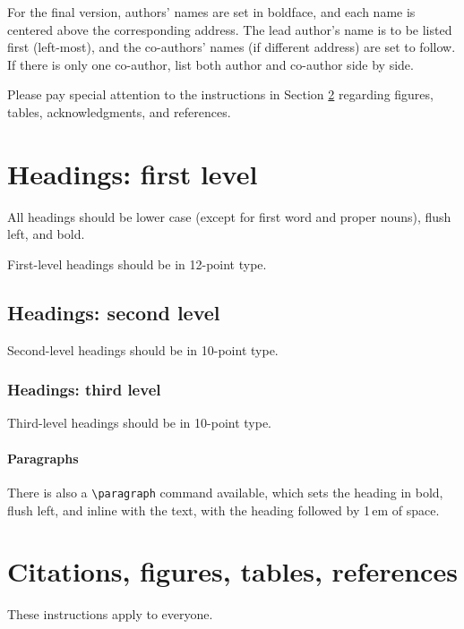 \documentclass{article}
\begin{document}
\begin{CJK}{UTF8}{gbsn}
For the final version, authors' names are set in boldface, and each name is
centered above the corresponding address. The lead author's name is to be listed
first (left-most), and the co-authors' names (if different address) are set to
follow. If there is only one co-author, list both author and co-author side by
side.


Please pay special attention to the instructions in Section \ref{others}
regarding figures, tables, acknowledgments, and references.


\section{Headings: first level}
\label{headings}


All headings should be lower case (except for first word and proper nouns),
flush left, and bold.


First-level headings should be in 12-point type.


\subsection{Headings: second level}


Second-level headings should be in 10-point type.


\subsubsection{Headings: third level}


Third-level headings should be in 10-point type.


\paragraph{Paragraphs}


There is also a \verb+\paragraph+ command available, which sets the heading in
bold, flush left, and inline with the text, with the heading followed by 1\,em
of space.


\section{Citations, figures, tables, references}
\label{others}


These instructions apply to everyone.



\end{CJK}
\end{document}
